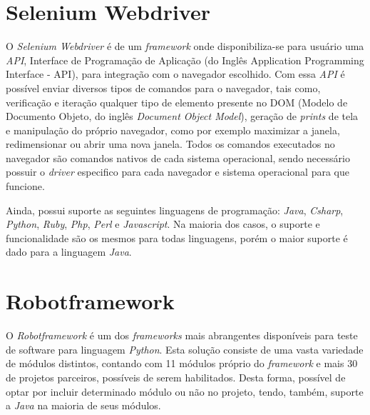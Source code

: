     \section{Selenium Webdriver}
    \label{sec:selenium}
        O \textit{Selenium Webdriver} \cite{webdriver} é de um \textit{framework} onde disponibiliza-se para usuário uma \textit{API}, Interface de
        Programação de Aplicação (do Inglês Application Programming Interface - API), para integração com o navegador escolhido. Com essa \textit{API}
        é possível enviar diversos tipos de comandos para o navegador, tais como, verificação e iteração qualquer tipo de elemento presente no DOM
        (Modelo de Documento Objeto, do inglês \textit{Document Object Model}), geração de \textit{prints} de tela e manipulação do próprio navegador,
        como por exemplo maximizar a janela, redimensionar ou abrir uma nova janela. Todos os comandos executados no navegador são comandos nativos de
        cada sistema operacional, sendo necessário possuir o \textit{driver} especifico para cada navegador e sistema operacional para que funcione.

        Ainda, possui suporte as seguintes linguagens de programação: \textit{Java}, \textit{Csharp}, \textit{Python}, \textit{Ruby}, \textit{Php},
        \textit{Perl} e \textit{Javascript}. Na maioria dos casos, o suporte e funcionalidade são os mesmos para todas linguagens, porém o maior suporte
        é dado para a linguagem \textit{Java}.


    \section{Robotframework}

        O \textit{Robotframework} \cite{robotframework} é um dos \textit{frameworks} mais abrangentes disponíveis para teste de software para linguagem
        \textit{Python}. Esta solução consiste de uma vasta variedade de módulos distintos, contando com 11 módulos próprio do \textit{framework} e
        mais 30 de projetos parceiros, possíveis de serem habilitados. Desta forma, possível de optar por incluir determinado módulo ou não no projeto,
        tendo, também, suporte a \textit{Java} na maioria de seus módulos.

